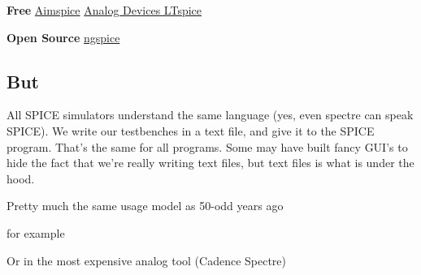 \textbf{Free} \href{http://aimspice.com}{Aimspice}
\href{https://www.analog.com/en/design-center/design-tools-and-calculators/ltspice-simulator.html}{Analog
Devices LTspice}

\textbf{Open Source} \href{http://ngspice.sourceforge.net}{ngspice}

\subsection{But}\label{but}

All SPICE simulators understand the same language (yes, even spectre can
speak SPICE). We write our testbenches in a text file, and give it to
the SPICE program. That's the same for all programs. Some may have built
fancy GUI's to hide the fact that we're really writing text files, but
text files is what is under the hood.

Pretty much the same usage model as 50-odd years ago

\begin{Shaded}
\begin{Highlighting}[]
\OperatorTok{\textless{}}\OperatorTok{\textgreater{}}
\end{Highlighting}
\end{Shaded}

for example

\begin{Shaded}
\begin{Highlighting}[]
\end{Highlighting}
\end{Shaded}

Or in the most expensive analog tool (Cadence Spectre)

\begin{Shaded}
\begin{Highlighting}[]
\end{Highlighting}
\end{Shaded}

